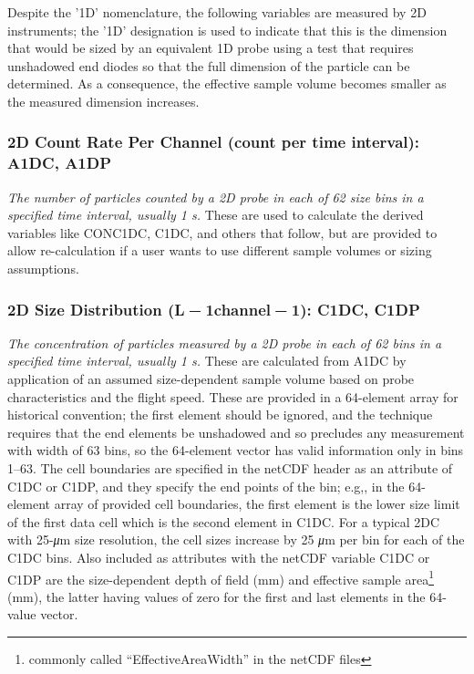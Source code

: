 \documentclass[
]{book}
\begin{document}
\protect\hypertarget{Despite-the-ux271Dux27}{}{}Despite the '1D' nomenclature, the following variables are measured by 2D instruments; the '1D' designation is used to indicate that this is the dimension that would be sized by an equivalent 1D probe using a test that requires unshadowed end diodes so that the full dimension of the particle can be determined. As a consequence, the effective sample volume becomes smaller as the measured dimension increases.

\hypertarget{a1dc-a1dp}{%
\subsubsection*{2D Count Rate Per Channel (count per time interval): A1DC, A1DP}\label{a1dc-a1dp}}

\emph{The number of particles counted by a 2D probe in each of 62 size bins in a specified time interval, usually 1 s.} These are used to calculate the derived variables like CONC1DC, C1DC, and others that follow, but are provided to allow re-calculation if a user wants to use different sample volumes or sizing assumptions.

\hypertarget{c1dc-c1dp}{%
\subsubsection*{\texorpdfstring{2D Size Distribution (L{ − 1}channel{ − 1}): C1DC, C1DP}{2D Size Distribution (L − 1channel − 1): C1DC, C1DP}}\label{c1dc-c1dp}}

\emph{The concentration of particles measured by a 2D probe in each of 62 bins in a specified time interval, usually 1 s.} These are calculated from A1DC by application of an assumed size-dependent sample volume based on probe characteristics and the flight speed. These are provided in a 64-element array for historical convention; the first element should be ignored, and the technique requires that the end elements be unshadowed and so precludes any measurement with width of 63 bins, so the 64-element vector has valid information only in bins 1--63. The cell boundaries are specified in the netCDF header as an attribute of C1DC or C1DP, and they specify the end points of the bin; e.g,, in the 64-element array of provided cell boundaries, the first element is the lower size limit of the first data cell which is the second element in C1DC. For a typical 2DC with 25-{\emph{μ}}m size resolution, the cell sizes increase by 25 {\emph{μ}}m per bin for each of the C1DC bins. Also included as attributes with the netCDF variable C1DC or C1DP are the size-dependent depth of field (mm) and effective sample area\footnote{commonly called ``EffectiveAreaWidth'' in the netCDF files}
(mm), the latter having values of zero for the first and last elements in the 64-value vector.
\end{document}
